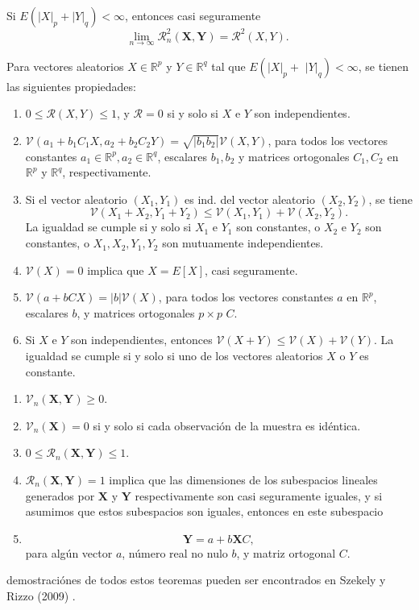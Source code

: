 	\begin{cor}
		Si $E\left(|X|_p+|Y|_q\right)<\infty$, entonces casi seguramente
		$$
		\lim _{n \rightarrow \infty} \mathcal{R}_n^2(\mathbf{X}, \mathbf{Y})=\mathcal{R}^2(X, Y) \text {. }
		$$
	\end{cor}
	\begin{thm}\label{thm3_brcov}
		Para vectores aleatorios $X \in \mathbb{R}^p$ y $Y \in \mathbb{R}^q$ tal que $E\left(|X|_p+\right.$ $\left.|Y|_q\right)<\infty$, se tienen las siguientes propiedades:
		\begin{enumerate}
			\item $0 \leq \mathcal{R}(X, Y) \leq 1$, y $\mathcal{R}=0$ si y solo si $X$ e $Y$ son independientes.
			\item $\mathcal{V}\left(a_1+b_1 C_1 X, a_2+b_2 C_2 Y\right)=\sqrt{\left|b_1 b_2\right|} \mathcal{V}(X, Y)$, para todos los vectores constantes $a_1 \in \mathbb{R}^p, a_2 \in \mathbb{R}^q$, escalares $b_1, b_2$ y matrices ortogonales $C_1, C_2$ en $\mathbb{R}^p$ y $\mathbb{R}^q$, respectivamente.	
			\item Si el vector aleatorio $\left(X_1, Y_1\right)$ es ind. del vector aleatorio $\left(X_2, Y_2\right)$, se tiene
			 $$
			\mathcal{V}\left(X_1+X_2, Y_1+Y_2\right) \leq \mathcal{V}\left(X_1, Y_1\right)+\mathcal{V}\left(X_2, Y_2\right) .
			$$
			La igualdad se cumple si y solo si $X_1$ e $Y_1$ son constantes, o $X_2$ e $Y_2$ son constantes, o $X_1, X_2, Y_1, Y_2$ son mutuamente independientes.

			\item $\mathcal{V}(X)=0$ implica que $X=E[X]$, casi seguramente.
			\item $\mathcal{V}(a+b C X)=|b| \mathcal{V}(X)$, para todos los vectores constantes $a$ en $\mathbb{R}^p$, escalares $b$, y matrices ortogonales $p \times p$ $C$.
			\item Si $X$ e $Y$ son independientes, entonces $\mathcal{V}(X+Y) \leq \mathcal{V}(X)+\mathcal{V}(Y)$. La igualdad se cumple si y solo si uno de los vectores aleatorios $X$ o $Y$ es constante.
		\end{enumerate}
	\end{thm}
	\begin{thm}
	\begin{enumerate}
		\item $\mathcal{V}_n(\mathbf{X}, \mathbf{Y}) \geq 0$.
		\item $\mathcal{V}_n(\mathbf{X})=0$ si y solo si cada observaci\'on de la muestra es id\'entica.
		\item $0 \leq \mathcal{R}_n(\mathbf{X}, \mathbf{Y}) \leq 1$.
		\item $\mathcal{R}_n(\mathbf{X}, \mathbf{Y})=1$ implica que las dimensiones de los subespacios lineales generados por $\mathbf{X}$ y $\mathbf{Y}$ respectivamente son casi seguramente iguales, y si asumimos que estos subespacios son iguales, entonces en este subespacio
		\item $$
		\mathbf{Y}=a+b \mathbf{X} C,
		$$
		para alg\'un vector $a$, n\'umero real no nulo $b$, y matriz ortogonal $C$.
	\end{enumerate}	
	\end{thm}
	demostraci\'ones de todos estos teoremas pueden ser encontrados en Szekely y Rizzo (2009) \cite{Szekely2009}.


